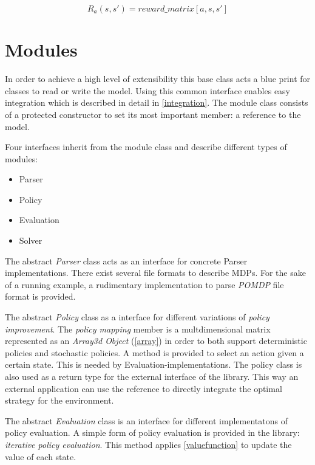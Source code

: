 \begin{equation}
R_a(s,s') = reward\_matrix[a,s,s']
\end{equation}



\section{Modules}
\label{chaptermodule}

In order to achieve a high level of extensibility this  base class acts a blue print for classes to read or write the model. Using this common interface enables easy integration which is described in detail in \autoref{integration}. The module class consists of a protected constructor to set its most important member: a reference to the model. 

Four interfaces inherit from the module class and describe different types of modules:

\begin{itemize}
	\item Parser
	\item Policy
	\item Evaluation
	\item Solver
\end{itemize}

The abstract \emph{Parser} class acts as an interface for concrete Parser implementations. There exist several file formats to describe MDPs. For the sake of a running example, a rudimentary implementation to parse \emph{POMDP} file format \autocite{Cassandra} is provided. 

The abstract \emph{Policy} class as a interface for different variations of \emph{policy improvement}. The \emph{policy mapping} member is a multdimensional matrix represented as an \emph{Array3d Object} (\autoref{array}) in order to both support deterministic policies and stochastic policies. A method is provided to select an action given a certain state. This is needed by Evaluation-implementations. The policy class is also used as a return type for the external interface of the library. This way an external application can use the reference to directly integrate the optimal strategy for the environment. 

The abstract \emph{Evaluation} class is an interface for different implementatons of policy evaluation. A simple form of policy evaluation is provided in the library: \emph{iterative policy evaluation}. This method applies \autoref{valuefunction} to update the value of each state. 

